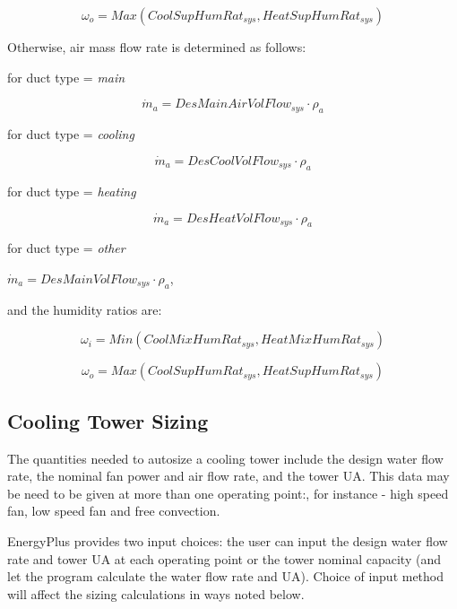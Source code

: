 \begin{equation}
  {\omega_o} = Max\left( {CoolSupHumRa{t_{sys}},HeatSupHumRa{t_{sys}}} \right)
\end{equation}

Otherwise, air mass flow rate is determined as follows:

for duct type = \emph{main}

\begin{equation}
{\dot m_a} = DesMainAirVolFlo{w_{sys}} \cdot {\rho_a}
\end{equation}

for duct type = \emph{cooling}

\begin{equation}
{\dot m_a} = DesCoolVolFlo{w_{sys}} \cdot {\rho_a}
\end{equation}

for duct type = \emph{heating}

\begin{equation}
{\dot m_a} = DesHeatVolFlo{w_{sys}} \cdot {\rho_a}
\end{equation}

for duct type = \emph{other}

\({\dot m_a} = DesMainVolFlo{w_{sys}} \cdot {\rho_a}\),

and the humidity ratios are:

\begin{equation}
{\omega_i} = Min\left( {CoolMixHumRa{t_{sys}},HeatMixHumRa{t_{sys}}} \right)
\end{equation}

\begin{equation}
  {\omega_o} = Max\left( {CoolSupHumRa{t_{sys}},HeatSupHumRa{t_{sys}}} \right)
\end{equation}

\subsection{Cooling Tower Sizing}\label{cooling-tower-sizing}

The quantities needed to autosize a cooling tower include the design water flow rate, the nominal fan power and air flow rate, and the tower UA. This data may be need to be given at more than one operating point:, for instance - high speed fan, low speed fan and free convection.

EnergyPlus provides two input choices: the user can input the design water flow rate and tower UA at each operating point or the tower nominal capacity (and let the program calculate the water flow rate and UA). Choice of input method will affect the sizing calculations in ways noted below.

